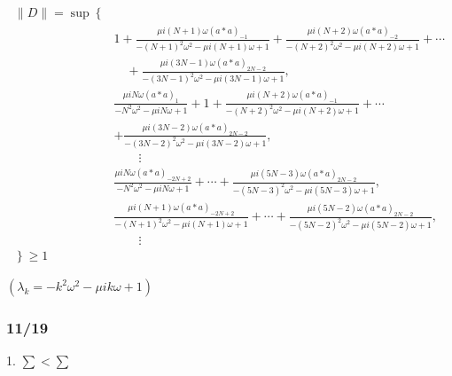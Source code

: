 \documentclass[11pt,a4paper]{jsarticle}
\theoremstyle{definition}
\begin{document}
\begin{equation}
  \begin{split}
    \| D \| =
    \sup \left\lbrace \right. &\\
      &1 + \frac{\mu i (N+1) \omega (a*a)_{-1} }{-(N+1)^2 \omega^2 - \mu i (N+1) \omega +1} + \frac{ \mu i (N+2) \omega (a*a)_{-2} }{-(N+2)^2 \omega^2 - \mu i (N+2)\omega + 1} + \cdots  \\ & \quad + \frac{ \mu i (3N-1) \omega (a*a)_{2N-2} }{-(3N-1)^2 \omega^2 - \mu i (3N-1)\omega + 1 }, \\
      &\frac{\mu i N \omega (a*a)_{1} }{-N^2 \omega^2 - \mu i N \omega +1} + 1 + \frac{\mu i (N+2) \omega (a*a)_{-1} }{-(N+2)^2 \omega^2 - \mu i (N+2) \omega +1} + \cdots \\ & + \frac{ \mu i (3N-2) \omega (a*a)_{2N-2} }{-(3N-2)^2 \omega^2 - \mu i (3N-2)\omega + 1 }, \\
      & \qquad \vdots \\
      &\frac{\mu i N \omega (a*a)_{-2N+2} }{-N^2 \omega^2 - \mu i N \omega +1} + \cdots + \frac{ \mu i (5N-3) \omega (a*a)_{2N-2} }{-(5N-3)^2 \omega^2 - \mu i (5N-3)\omega + 1 }, \\
      &\frac{\mu i (N+1) \omega (a*a)_{-2N+2} }{-(N+1)^2 \omega^2 - \mu i (N+1) \omega +1} + \cdots + \frac{ \mu i (5N-2) \omega (a*a)_{2N-2} }{-(5N-2)^2 \omega^2 - \mu i (5N-2)\omega + 1 }, \\
      & \qquad \vdots \\
    \left. \right\rbrace \geq 1 &
  \end{split}
\end{equation}


$(\lambda_k = -k^2 \omega^2 - \mu i k \omega + 1)$

\subsubsection*{11/19}
1. $\sum < \sum$
\end{document}
